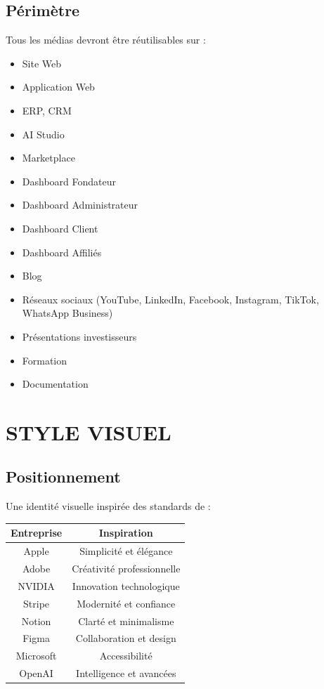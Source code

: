 \documentclass[12pt,a4paper,oneside]{book}
\begin{document}
\section{Périmètre}
Tous les médias devront être réutilisables sur :
\begin{itemize}
\item Site Web
\item Application Web
\item ERP, CRM
\item AI Studio
\item Marketplace
\item Dashboard Fondateur
\item Dashboard Administrateur
\item Dashboard Client
\item Dashboard Affiliés
\item Blog
\item Réseaux sociaux (YouTube, LinkedIn, Facebook, Instagram, TikTok, WhatsApp Business)
\item Présentations investisseurs
\item Formation
\item Documentation
\end{itemize}

\chapter{STYLE VISUEL}

\section{Positionnement}
Une identité visuelle inspirée des standards de :

\bigskip
\begin{center}
\begin{tabular}{|c|c|}
\hline
\rowcolor{bleuIA}
\color{white}\textbf{Entreprise} & \color{white}\textbf{Inspiration} \\
\hline
Apple & Simplicité et élégance \\
\hline
Adobe & Créativité professionnelle \\
\hline
NVIDIA & Innovation technologique \\
\hline
Stripe & Modernité et confiance \\
\hline
Notion & Clarté et minimalisme \\
\hline
Figma & Collaboration et design \\
\hline
Microsoft & Accessibilité \\
\hline
OpenAI & Intelligence et avancées \\
\hline
\end{tabular}
\end{center}
\end{document}
